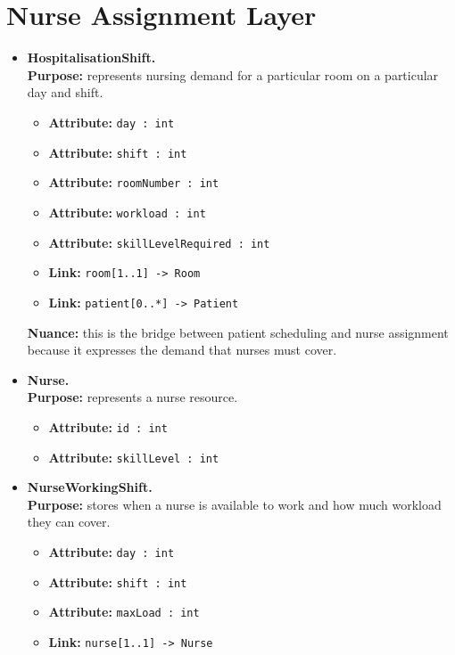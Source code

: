 \documentclass[10pt]{article}
\newcommand{\clabel}[1]{{\large\bfseries #1}}
\begin{document}
\section*{Nurse Assignment Layer}
\begin{itemize}
    \item \clabel{HospitalisationShift.}\\
    \textbf{Purpose:} represents nursing demand for a particular room on a particular day and shift.
    \begin{itemize}
        \item \textbf{Attribute:} \texttt{day : int}
        \item \textbf{Attribute:} \texttt{shift : int}
        \item \textbf{Attribute:} \texttt{roomNumber : int}
        \item \textbf{Attribute:} \texttt{workload : int}
        \item \textbf{Attribute:} \texttt{skillLevelRequired : int}
        \item \textbf{Link:} \texttt{room[1..1] -> Room}
        \item \textbf{Link:} \texttt{patient[0..*] -> Patient}
    \end{itemize}
    \textbf{Nuance:} this is the bridge between patient scheduling and nurse assignment because it expresses the demand that nurses must cover.

    \item \clabel{Nurse.}\\
    \textbf{Purpose:} represents a nurse resource.
    \begin{itemize}
        \item \textbf{Attribute:} \texttt{id : int}
        \item \textbf{Attribute:} \texttt{skillLevel : int}
    \end{itemize}

    \item \clabel{NurseWorkingShift.}\\
    \textbf{Purpose:} stores when a nurse is available to work and how much workload they can cover.
    \begin{itemize}
        \item \textbf{Attribute:} \texttt{day : int}
        \item \textbf{Attribute:} \texttt{shift : int}
        \item \textbf{Attribute:} \texttt{maxLoad : int}
        \item \textbf{Link:} \texttt{nurse[1..1] -> Nurse}
    \end{itemize}


\end{itemize}
\end{document}
